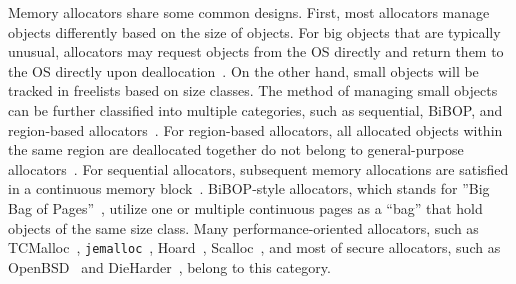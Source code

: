 Memory allocators share some common designs. First, most allocators manage objects differently based on the size of objects. For big objects that are typically unusual, allocators may request objects from the OS directly and return them to the OS directly upon deallocation~\cite{Hoard}. On the other hand, small objects will be tracked in freelists based on size classes. The method of managing small objects can be further classified into multiple categories, such as sequential, BiBOP, and region-based allocators~\cite{DieHarder, Gay:1998:MME:277650.277748}. For region-based allocators, all allocated objects within the same region are deallocated together do not belong to general-purpose allocators~\cite{Gay:1998:MME:277650.277748}. For sequential allocators, subsequent memory allocations are satisfied in a continuous memory block~\cite{Cling}. BiBOP-style allocators, which stands for ''Big Bag of Pages''~\cite{hanson1980portable}, utilize one or multiple continuous pages as a ``bag'' that hold objects of the same size class. Many performance-oriented allocators, such as TCMalloc~\cite{tcmalloc}, \texttt{jemalloc}~\cite{jemalloc}, Hoard~\cite{Hoard}, Scalloc~\cite{Scalloc}, and most of secure allocators, such as OpenBSD~\cite{openbsd} and DieHarder~\cite{DieHarder}, belong to this category. 

 

 